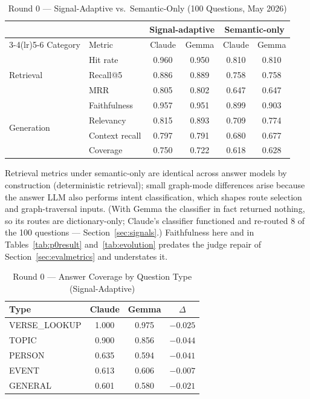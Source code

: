 \begin{table}[!t]
\caption{Round 0 --- Signal-Adaptive vs.\ Semantic-Only (100 Questions,
May 2026)}
\label{tab:round0}
\centering
\begin{threeparttable}
\begin{tabular}{@{}llcccc@{}}
\toprule
& & \multicolumn{2}{c}{Signal-adaptive} & \multicolumn{2}{c}{Semantic-only} \\
\cmidrule(lr){3-4}\cmidrule(lr){5-6}
Category & Metric & Claude & Gemma & Claude & Gemma \\
\midrule
\multirow{3}{*}{Retrieval}
& Hit rate   & 0.960 & 0.950 & 0.810 & 0.810 \\
& Recall@5   & 0.886 & 0.889 & 0.758 & 0.758 \\
& MRR        & 0.805 & 0.802 & 0.647 & 0.647 \\
\midrule
\multirow{4}{*}{Generation}
& Faithfulness   & 0.957 & 0.951 & 0.899 & 0.903 \\
& Relevancy      & 0.815 & 0.893 & 0.709 & 0.774 \\
& Context recall & 0.797 & 0.791 & 0.680 & 0.677 \\
& Coverage       & 0.750 & 0.722 & 0.618 & 0.628 \\
\bottomrule
\end{tabular}
\begin{tablenotes}\footnotesize
\item Retrieval metrics under semantic-only are identical across answer
models by construction (deterministic retrieval); small graph-mode
differences arise because the answer LLM also performs intent
classification, which shapes route selection and graph-traversal
inputs. (With
Gemma the classifier in fact returned nothing, so its routes are
dictionary-only; Claude's classifier functioned and re-routed 8 of the
100 questions --- Section~\ref{sec:signals}.) Faithfulness here and in
Tables~\ref{tab:p0result} and~\ref{tab:evolution} predates the judge
repair of Section~\ref{sec:evalmetrics} and understates it.
\end{tablenotes}
\end{threeparttable}
\end{table}

\begin{table}[!t]
\caption{Round 0 --- Answer Coverage by Question Type (Signal-Adaptive)}
\label{tab:round0bytype}
\centering
\begin{tabular}{@{}lccc@{}}
\toprule
Type & Claude & Gemma & $\Delta$ \\
\midrule
VERSE\_LOOKUP & 1.000 & 0.975 & $-0.025$ \\
TOPIC   & 0.900 & 0.856 & $-0.044$ \\
PERSON  & 0.635 & 0.594 & $-0.041$ \\
EVENT   & 0.613 & 0.606 & $-0.007$ \\
GENERAL & 0.601 & 0.580 & $-0.021$ \\
\bottomrule
\end{tabular}
\end{table}

